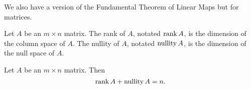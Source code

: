 We also have a version of the Fundamental Theorem of Linear Maps but for matrices.
\begin{definition}
	Let $A$ be an $m \times n$ matrix.
	The rank of $A$, notated $\operatorname{rank}{A}$, is the dimension of the column space of $A$.
	The nullity of $A$, notated $\operatorname{nullity}{A}$, is the dimension of the null space of $A$.
\end{definition}

\begin{theorem}
	Let $A$ be an $m \times n$ matrix.
	Then
	\begin{equation*}
		\operatorname{rank}{A} + \operatorname{nullity}{A} = n.
	\end{equation*}
\end{theorem}